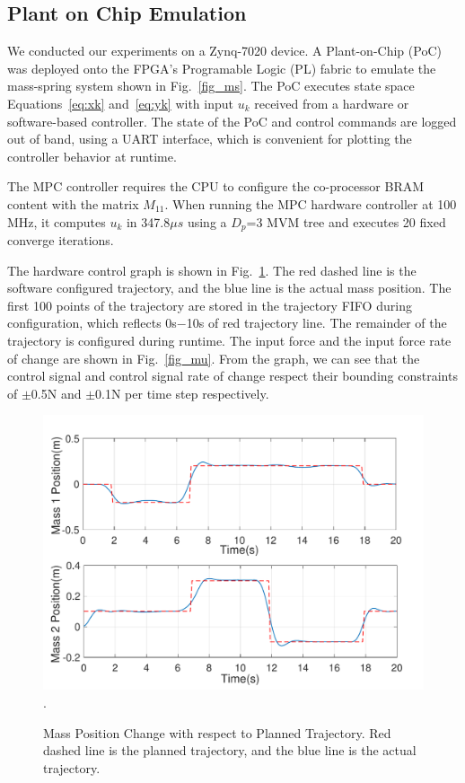 \subsection{Plant on Chip Emulation}
We conducted our experiments on a Zynq-7020 device. A Plant-on-Chip (PoC) was deployed onto the FPGA's Programable Logic (PL) fabric to emulate the mass-spring system shown in Fig.~\ref{fig_ms}. The PoC executes state space Equations~\ref{eq:xk} and~\ref{eq:yk} with input $u_k$ received from a hardware or software-based controller. The state of the PoC and control commands are logged out of band, using a UART interface, which is convenient for plotting the controller behavior at runtime.\par
The MPC controller requires the CPU to configure the co-processor BRAM content with the matrix $M_{11}$. When running the MPC hardware controller at 100 MHz, it computes $u_k$ in 347.8$\mu s$ using a $D_p$=3 MVM tree and executes 20 fixed converge iterations.\par
The hardware control graph is shown in Fig.~\ref{fig_mp}. The red dashed line is the software configured trajectory, and the blue line is the actual mass position. The first 100 points of the trajectory are stored in the trajectory FIFO during configuration, which reflects 0s$-$10s of red trajectory line. The remainder of the trajectory is configured during runtime. The input force and the input force rate of change are shown in Fig.~\ref{fig_mu}. From the graph, we can see that the control signal and control signal rate of change respect their bounding constraints of $\pm$0.5N and $\pm$0.1N per time step respectively.

\begin{figure}[t]
\centering
\captionsetup{justification=centering}
\includegraphics[scale=.45]{../figure/MP.pdf}
\DeclareGraphicsExtensions.
\caption{Mass Position Change with respect to Planned Trajectory. Red dashed line is the planned trajectory, and the blue line is the actual trajectory.\label{fig_mp}}
\end{figure}

